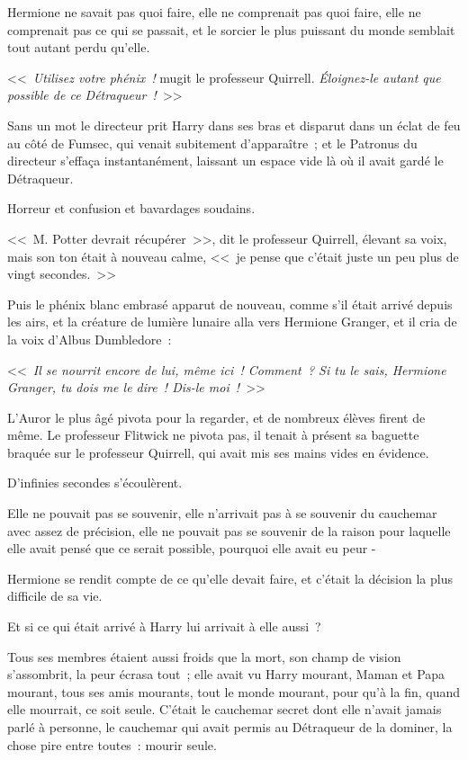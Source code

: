 Hermione ne savait pas quoi faire, elle ne comprenait pas quoi faire, elle ne comprenait pas ce qui se passait, et le sorcier le plus puissant du monde semblait tout autant perdu qu'elle.

<<~\emph{Utilisez votre phénix~!} mugit le professeur Quirrell. \emph{Éloignez-le autant que possible de ce Détraqueur~!}~>>

Sans un mot le directeur prit Harry dans ses bras et disparut dans un éclat de feu au côté de Fumsec, qui venait subitement d'apparaître~; et le Patronus du directeur s'effaça instantanément, laissant un espace vide là où il avait gardé le Détraqueur.

Horreur et confusion et bavardages soudains.

<<~M. Potter devrait récupérer~>>, dit le professeur Quirrell, élevant sa voix, mais son ton était à nouveau calme, <<~je pense que c'était juste un peu plus de vingt secondes.~>>

Puis le phénix blanc embrasé apparut de nouveau, comme s'il était arrivé depuis les airs, et la créature de lumière lunaire alla vers Hermione Granger, et il cria de la voix d'Albus Dumbledore~:

<<~\emph{Il se nourrit encore de lui, même ici~! Comment~? Si tu le sais, Hermione Granger, tu dois me le dire~! Dis-le moi~!}~>>

L'Auror le plus âgé pivota pour la regarder, et de nombreux élèves firent de même. Le professeur Flitwick ne pivota pas, il tenait à présent sa baguette braquée sur le professeur Quirrell, qui avait mis ses mains vides en évidence.

D'infinies secondes s'écoulèrent.

Elle ne pouvait pas se souvenir, elle n'arrivait pas à se souvenir du cauchemar avec assez de précision, elle ne pouvait pas se souvenir de la raison pour laquelle elle avait pensé que ce serait possible, pourquoi elle avait eu peur -

Hermione se rendit compte de ce qu'elle devait faire, et c'était la décision la plus difficile de sa vie.

Et si ce qui était arrivé à Harry lui arrivait à elle aussi~?

Tous ses membres étaient aussi froids que la mort, son champ de vision s'assombrit, la peur écrasa tout~; elle avait vu Harry mourant, Maman et Papa mourant, tous ses amis mourants, tout le monde mourant, pour qu'à la fin, quand elle mourrait, ce soit seule. C'était le cauchemar secret dont elle n'avait jamais parlé à personne, le cauchemar qui avait permis au Détraqueur de la dominer, la chose pire entre toutes~: mourir seule.

